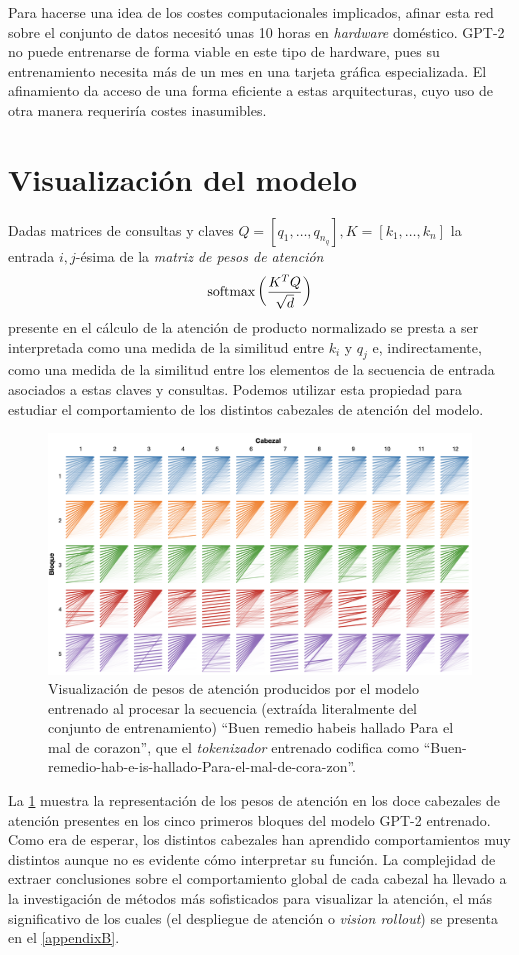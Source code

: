 Para hacerse una idea de los costes computacionales implicados, afinar esta red sobre el conjunto de datos necesitó unas 10 horas en \textit{hardware} doméstico. GPT-2 no puede entrenarse de forma viable en este tipo de hardware, pues su entrenamiento necesita más de un mes en una tarjeta gráfica especializada. El afinamiento da acceso de una forma eficiente a estas arquitecturas, cuyo uso de otra manera requeriría costes inasumibles.

\section{Visualización del modelo}
Dadas matrices de consultas y claves \( Q = [q_1, …, q_{n_q}], K = [k_1, …, k_n] \) la entrada \( i, j \)-ésima de la \textit{matriz {de pesos de atención}}
\[
  \operatorname{softmax} \left( \frac{K^T Q}{\sqrt{d}} \right)
\] 
presente en el cálculo de la atención de producto normalizado se presta a ser interpretada como una medida de la similitud entre \( k_i \) y \( q_j \) e, indirectamente, como una medida de la similitud entre los elementos de la secuencia de entrada asociados a estas claves y consultas. Podemos utilizar esta propiedad para estudiar el comportamiento de los distintos cabezales de atención del modelo.

\begin{figure}[tb]
  \centering
  \includegraphics[width=\textwidth]{figures/chapter5/attention.png}
  \caption{Visualización de pesos de atención producidos por el modelo entrenado al procesar la secuencia (extraída literalmente del conjunto de entrenamiento) ``Buen remedio habeis hallado Para el mal de corazon'', que el \textit{tokenizador} entrenado codifica como ``Buen-remedio-hab-e-is-hallado-Para-el-mal-de-cora-zon''. }
  \label{fig:attention_visualizada}
\end{figure}

La \cref{fig:attention_visualizada} muestra la representación de los pesos de atención en los doce cabezales de atención presentes en los cinco primeros bloques del modelo GPT-2 entrenado. Como era de esperar, los distintos cabezales han aprendido comportamientos muy distintos aunque no es evidente cómo interpretar su función. La complejidad de extraer conclusiones sobre el comportamiento global de cada cabezal ha llevado a la investigación de métodos más sofisticados para visualizar la atención, el más significativo de los cuales (el despliegue de atención o \textit{vision rollout}) se presenta en el \cref{appendixB}.


